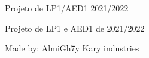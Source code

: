 Projeto de LP1/\+AED1 2021/2022

Projeto de LP1 e AED1 de 2021/2022

Made by\+: Almi\+Gh7y Kary industries 